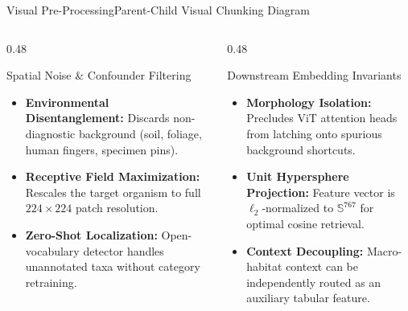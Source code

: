 \begin{frame}{Visual Pre-Processing}{Parent-Child Visual Chunking Diagram}
{\begin{tikzpicture}
    \end{tikzpicture}%
    }

    \vspace{-0.10cm}

    \begin{columns}[T]
        \begin{column}{0.48\textwidth}
            \begin{block}{Spatial Noise \& Confounder Filtering}
                \begin{itemize}\scriptsize
                    \setlength{\itemsep}{2pt}
                    \item \textbf{Environmental Disentanglement:} Discards non-diagnostic background (soil, foliage, human fingers, specimen pins).
                    \item \textbf{Receptive Field Maximization:} Rescales the target organism to full $224 \times 224$ patch resolution.
                    \item \textbf{Zero-Shot Localization:} Open-vocabulary detector handles unannotated taxa without category retraining.
                \end{itemize}
            \end{block}
        \end{column}

        \begin{column}{0.48\textwidth}
            \begin{block}{Downstream Embedding Invariants}
                \begin{itemize}\scriptsize
                    \setlength{\itemsep}{2pt}
                    \item \textbf{Morphology Isolation:} Precludes ViT attention heads from latching onto spurious background shortcuts.
                    \item \textbf{Unit Hypersphere Projection:} Feature vector is $\ell_2$-normalized to $\mathbb{S}^{767}$ for optimal cosine retrieval.
                    \item \textbf{Context Decoupling:} Macro-habitat context can be independently routed as an auxiliary tabular feature.
                \end{itemize}
            \end{block}
        \end{column}
    \end{columns}

\end{frame}

